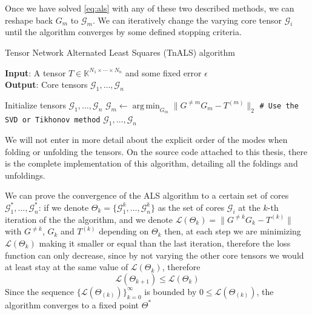 \documentclass[11pt,a4paper,openright,oneside]{book}
\numberwithin{equation}{section}
\DeclareMathOperator*{\argmin}{arg\,min}
\begin{document}
{Once we have solved \eqref{eq:als} with any of these two described methods, we can reshape back $G_m$ to $\mathcal{G}_m$.
We can iteratively change the varying core tensor $\mathcal{G}_i$ until the algorithm converges by some defined stopping criteria.

\begin{algorithm}[H]
    \caption{Tensor Network Alternated Least Squares (\gls{TnALS}) algorithm}

    \hspace*{\algorithmicindent} \textbf{Input}: A tensor $T \in \mathbb{K}^{N_1 \times \cdots \times N_n}$ and some fixed error $\epsilon$ \\
    \hspace*{\algorithmicindent} \textbf{Output}: Core tensors $\mathcal{G}_1, \dots, \mathcal{G}_n$ 

    \begin{algorithmic}[1]
        \State Initialize tensors $\mathcal{G}_1, \dots, \mathcal{G}_n$
            \State $\mathcal{G}_m \leftarrow \argmin_{G_m} \|G^{\neq m} G_m - T^{(m)}\|_2$ \qquad \verb|# Use the SVD or Tikhonov method|
            \EndFor
        \EndWhile
        \State \Return $\mathcal{G}_1, \dots, \mathcal{G}_n$

    \end{algorithmic}

\end{algorithm}

We will not enter in more detail about the explicit order of the modes when folding or unfolding the tensors. On the source code
attached to this thesis, there is the complete implementation of this algorithm, detailing all the foldings and unfoldings.

We can prove the convergence of the ALS algorithm to a certain set of cores $\mathcal{G}_1^*, \dots, \mathcal{G}_n^*$: if we denote
$\Theta_k = \{\mathcal{G}_1^k, \dots, \mathcal{G}_n^k\}$ as the set of cores $\mathcal{G}_i$ at the $k$-th iteration of the the algorithm,
and we denote $\mathcal{L}(\Theta_k) = \|G^{\neq k} G_k - T^{(k)}\|$ with $G^{\neq k}$, $G_k$ and $T^{(k)}$ depending on $\Theta_k$ then,
at each step we are minimizing $\mathcal{L}(\Theta_k)$ making it smaller or equal than the last iteration, 
therefore the loss function can
only decrease, since by not varying the other core tensors we would at least stay at the same value of $\mathcal{L}(\Theta_k)$, therefore
$$\mathcal{L}(\Theta_{k+1}) \leqslant \mathcal{L}(\Theta_k)$$
Since the sequence $\{\mathcal{L}(\Theta_{(k)})\}_{k=0}^\infty$ is bounded by $0 \leqslant \mathcal{L}(\Theta_{(k)})$,
the algorithm converges to a fixed point $\Theta^*$

}
\end{document}
